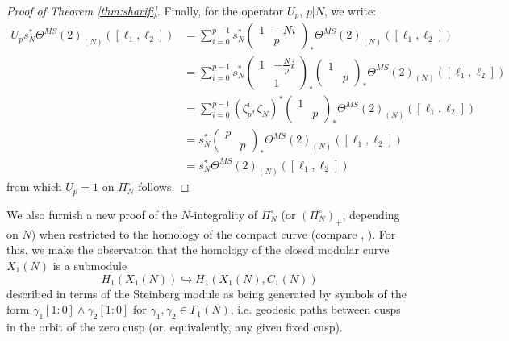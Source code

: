 \documentclass[10pt]{amsart}
\theoremstyle{definition}
\numberwithin{equation}{section}
\begin{document}
\begin{proof}[Proof of Theorem \ref{thm:sharifi}]
    Finally, for the operator $U_p$, $p|N$, we write:
    \begin{align}
        U_p s_N^*\Theta^{MS}(2)_{(N)}([\ell_1,\ell_2]) &= \sum_{i=0}^{p-1} s_N^*\begin{pmatrix}1 & -Ni \\ & p\end{pmatrix}_*\Theta^{MS}(2)_{(N)}([\ell_1,\ell_2]) \\
        & = \sum_{i=0}^{p-1} s_N^*\begin{pmatrix}1 & -\frac{N}{p}i \\ & 1\end{pmatrix}_*\begin{pmatrix}1& \\ & p \end{pmatrix}_*\Theta^{MS}(2)_{(N)}([\ell_1,\ell_2]) \\
        & = \sum_{i=0}^{p-1} (\zeta_p^i, \zeta_N)^*\begin{pmatrix}1& \\ & p \end{pmatrix}_*\Theta^{MS}(2)_{(N)}([\ell_1,\ell_2]) \\
        & = s_N^* \begin{pmatrix}p& \\ & p \end{pmatrix}_*\Theta^{MS}(2)_{(N)}([\ell_1,\ell_2]) \\
        & = s_N^* \Theta^{MS}(2)_{(N)}([\ell_1,\ell_2]) 
    \end{align}
    from which $U_p=1$ on $\Pi_N^\circ$ follows.
    \end{proof}

    We also furnish a new proof of the $N$-integrality of $\Pi_N^\circ$ (or $(\Pi_N^\circ)_+$, depending on $N$) when restricted to the homology of the compact curve (compare \cite[Lemma 4.2.7]{SV}, \cite[Lemma 3.3.11]{FK}). For this, we make the observation that the homology of the closed modular curve $X_1(N)$ is a submodule 
    \[
     H_1(X_1(N)) \hookrightarrow H_1(X_1(N),C_1(N))
    \]
    described in terms of the Steinberg module as being generated by symbols of the form $\gamma_1[1:0]\wedge \gamma_2[1:0]$ for $\gamma_1,\gamma_2\in \Gamma_1(N)$, i.e. geodesic paths between cusps in the orbit of the zero cusp (or, equivalently, any given fixed cusp).
    
\end{document}
